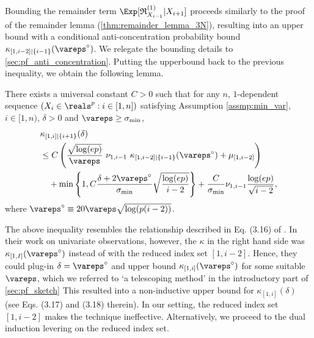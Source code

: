 \documentclass[aos]{imsart}
\begin{document}
\medskip
{}
Bounding the remainder term $\Exp[ \mathfrak{R}_{X_{i-1}}^{(1)} | X_{i+1} ]$ proceeds similarly to the proof of the remainder lemma (\cref{thm:remainder_lemma_3N}), resulting into an upper bound with %
a conditional anti-concentration probability bound $\kappa_{[1,i-2]|\{i-1\}}(\vareps^\circ)$. We relegate the bounding details to \cref{sec:pf_anti_concentration}. Putting the upperbound back to the previous inequality, we obtain the following lemma.

\begin{lemma} %
\label{thm:induction_lemma_AC_N}
    There exists a universal constant $C > 0$ such that for any $n$, $1$-dependent sequence $(X_i \in \reals^p: i \in [1,n])$ satisfying Assumption \eqref{assmp:min_var}, $i \in [1,n)$, $\delta > 0$ and $\vareps \geq \sigma_{\min}$,
    \begin{equation*} %
    \begin{aligned}
        & \kappa_{[1,i]|\{i+1\}}(\delta) \\
        & \leq C \left( 
            \frac{\sqrt{\log(ep)}}{\vareps} 
            ~ \nu_{1,i-1} 
            ~ \kappa_{[1,i-2]|\{i-1\}}(\vareps^\circ)
            + \mu_{[1,i-2]} 
        \right)\\
        & \quad + \min\left\{1, C\frac{\delta + 2\vareps^\circ}{\sigma_{\min}} \sqrt{\frac{\log(ep)}{i-2}} \right\} + \frac{C}{\sigma_{\min}} \nu_{1,i-1} \frac{\log(ep)}{\sqrt{i-2}},
    \end{aligned}
    \end{equation*}
    where $\vareps^\circ \equiv 20\vareps \sqrt{\log(p(i-2))}$. 
\end{lemma}

The above inequality resembles the relationship described in Eq. (3.16) of \citet{chen2004normal}. %
In their work on univariate observations, however, the $\kappa$ in the right hand side was $\kappa_{[1,I]}(\vareps^\circ)$ instead of with the reduced index set $[1, i-2]$. Hence, they could plug-in $\delta = \vareps^\circ$ and upper bound $\kappa_{[1,i]}(\vareps^\circ)$ for some suitable $\vareps$, which we referred to `a telescoping method' in the introductory part of \cref{sec:pf_sketch} 
This resulted into a non-inductive upper bound for $\kappa_{[1,i]}(\delta)$ (see Eqs. (3.17) and (3.18) therein). In our setting, the reduced index set $[1,i-2]$ makes the technique ineffective. Alternatively, we proceed to the dual induction levering on the reduced index set.
\end{document}

